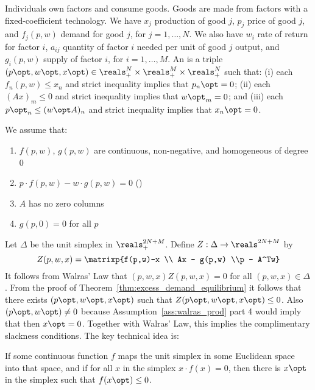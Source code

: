 \documentclass[10pt]{article}
\begin{document}
\begin{model}
	 Individuals own factors and consume goods. Goods are made from factors with a fixed-coefficient technology. We have $x_j$ production of good $j$, $p_j$ price of good $j$, and $f_j(p,w)$ demand for good $j$, for $j = 1,\dots,N$. We also have $w_i$ rate of return for factor $i$, $a_{ij}$ quantity of factor $i$ needed per unit of good $j$ output, and $g_i(p,w)$ supply of factor $i$, for $i=1,\dots,M$. An  is a triple $(p\opt,w\opt,x\opt) \in \reals^N_+ \times \reals^M_+ \times \reals^N_+$ such that: (i) each $f_n(p,w) \le x_n$ and strict inequality implies that $p_n\opt = 0$; (ii) each $(Ax)_m \le 0$ and strict inequality implies that $w\opt_m = 0$; and (iii) each $p\opt_n \le (w\opt A)_n$ and strict inequality implies that $x_n\opt = 0$. 
	
	\begin{assumption}\label{ass:walras_prod}
		We assume that:
		\begin{enumerate}
			\item $f(p,w)$, $g(p,w)$ are continuous, non-negative, and homogeneous of degree 0
			\item $p \cdot f(p,w) - w \cdot g(p,w) = 0$ ()
			\item $A$ has no zero columns
			\item $g(p,0) = 0$ for all $p$
		\end{enumerate}
	\end{assumption}
	
	Let $\Delta$ be the unit simplex in $\reals^{2N+M}_+$. Define $Z : \Delta \to \reals^{2N+M}$ by \[Z(p,w,x) = \matrixp{f(p,w)-x \\ Ax - g(p,w) \\p - A^Tw}\]It follows from Walras' Law that $(p,w,x)Z(p,w,x) = 0$ for all $(p,w,x) \in \Delta$. From the proof of Theorem~\ref{thm:excess_demand_equilibrium} it follows that there exists $(p\opt,w\opt,x\opt)$ such that $Z(p\opt,w\opt,x\opt)\le0$. Also $(p\opt,w\opt) \ne 0$ because Assumption~\ref{ass:walras_prod} part 4 would imply that then $x\opt = 0$. Together with Walras' Law, this implies the complimentary slackness conditions. The key technical idea is:
	
	\begin{lemma}
		 If some continuous function $f$ maps the unit simplex in some Euclidean space into that space, and if for all $x$ in the simplex $x \cdot f(x) = 0$, then there is $x\opt$ in the simplex such that $f(x\opt) \le 0$.
	\end{lemma}
\end{model}
\end{document}
